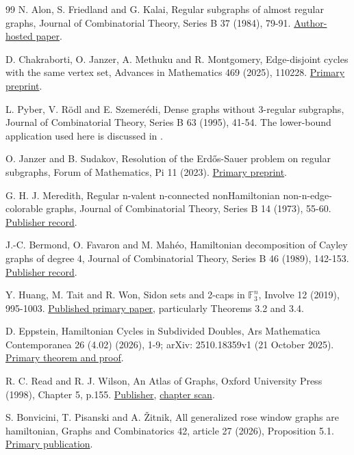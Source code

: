 \documentclass[smallextended]{svjour3}
\begin{document}
\begin{thebibliography}{99}
N. Alon, S. Friedland and G. Kalai, Regular subgraphs of almost
regular graphs, Journal of Combinatorial Theory, Series B 37 (1984),
79-91.
\href{https://web.math.princeton.edu/~nalon/PDFS/Publications/Regular\%20subgraphs\%20of\%20almost\%20regular\%20graphs.pdf}{Author-hosted
paper}.

D. Chakraborti, O. Janzer, A. Methuku and R. Montgomery,
Edge-disjoint cycles with the same vertex set, Advances in Mathematics
469 (2025), 110228. \href{https://arxiv.org/abs/2404.07190}{Primary
preprint}.

L. Pyber, V. Rödl and E. Szemerédi, Dense graphs without
3-regular subgraphs, Journal of Combinatorial Theory, Series B 63
(1995), 41-54. The lower-bound application used here is discussed in
\cite{ref2}.

O. Janzer and B. Sudakov, Resolution of the Erdős-Sauer problem
on regular subgraphs, Forum of Mathematics, Pi 11 (2023).
\href{https://arxiv.org/abs/2204.12455}{Primary preprint}.

G. H. J. Meredith, Regular n-valent n-connected nonHamiltonian
non-n-edge-colorable graphs, Journal of Combinatorial Theory, Series B
14 (1973), 55-60.
\href{https://doi.org/10.1016/S0095-8956(73)80006-1}{Publisher record}.

J.-C. Bermond, O. Favaron and M. Mahéo, Hamiltonian
decomposition of Cayley graphs of degree 4, Journal of Combinatorial
Theory, Series B 46 (1989), 142-153.
\href{https://doi.org/10.1016/0095-8956(89)90040-3}{Publisher record}.

Y. Huang, M. Tait and R. Won, Sidon sets and 2-caps in
\(\mathbb F_3^n\), Involve 12 (2019), 995-1003.
\href{https://msp.org/involve/2019/12-6/involve-v12-n6-p06-p.pdf}{Published
primary paper}, particularly Theorems 3.2 and 3.4.

D. Eppstein, Hamiltonian Cycles in Subdivided Doubles, Ars
Mathematica Contemporanea 26 (4.02) (2026), 1-9; arXiv: 2510.18359v1 (21
October 2025). \href{https://arxiv.org/html/2510.18359v1}{Primary
theorem and proof}.

R. C. Read and R. J. Wilson, An Atlas of Graphs, Oxford
University Press (1998), Chapter 5, p.155.
\href{https://academic.oup.com/book/54439}{Publisher},
\href{https://oeis.org/A000088/a000088_14.pdf}{chapter scan}.

S. Bonvicini, T. Pisanski and A. Žitnik, All generalized rose
window graphs are hamiltonian, Graphs and Combinatorics 42, article 27
(2026), Proposition 5.1.
\href{https://doi.org/10.1007/s00373-026-03016-w}{Primary publication}.


\end{thebibliography}
\end{document}
